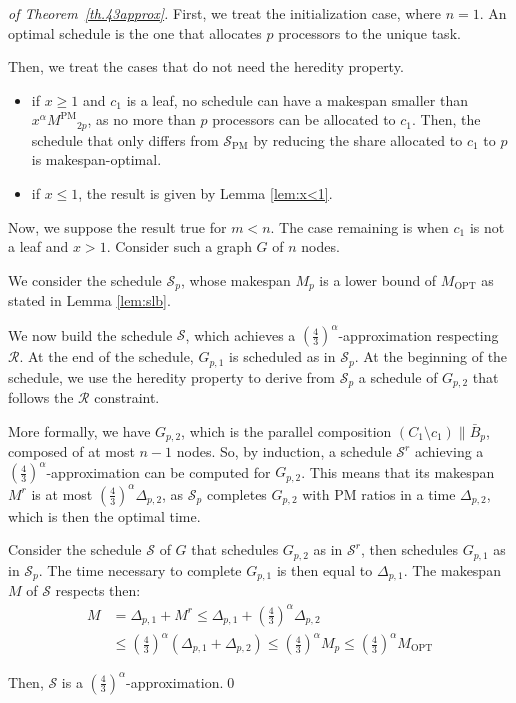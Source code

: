 \documentclass{llncs}
\newcommand{\para}[2]{#1 \mathop{\parallel} #2}
\newcommand{\s}{\mathcal S\xspace}
\newcommand{\spm}{\ensuremath{\mathcal{S}_{\mathrm{PM}}}\xspace}
\newcommand{\mpm}{\ensuremath{M^{\mathrm{PM}}}\xspace}
\newcommand{\mopt}{\ensuremath{{M}_{\mathrm{OPT}}}\xspace}
\newcommand{\R}{\ensuremath{\mathcal{R}}\xspace}
\newcommand{\frtrd}{\ensuremath{\left(\frac{4}{3}\right)^\alpha}}
\begin{document}
 
\begin{proof}[of Theorem~\ref{th.43approx}]
First, we treat the initialization case, where $n=1$. An optimal schedule is the one that allocates $p$ processors to the unique task.

Then, we treat the cases that do not need the heredity property.
\begin{itemize}
\item if $x\geq 1$ and $c_1$ is a leaf, no schedule can have a makespan smaller than $x^\alpha \mpm_{2p}$, as no more than $p$ processors can be allocated to $c_1$. Then, the schedule that only differs from \spm by reducing the share allocated to $c_1$ to $p$ is makespan-optimal.
\item if $x\leq 1$, the result is given by Lemma \ref{lem:x<1}. 
\end{itemize}

Now, we suppose the result true for $m<n$. The case remaining is when $c_1$ is not a leaf and $x>1$. Consider such a graph $G$ of $n$ nodes.





We consider the schedule $\s_p$, whose makespan $M_p$ is a lower bound of \mopt as stated in Lemma \ref{lem:slb}.  




We now build the schedule $\s$, which achieves a $\frtrd$-approximation respecting $\R$.
At the end of the schedule, $G_{p,1}$ is scheduled as in $\s_p$. At the beginning of the schedule, we use the heredity property to derive from $\s_p$ a schedule of $G_{p,2}$ that follows the \R constraint.


More formally, we have $G_{p,2}$, which is the parallel composition $\para{(C_1\setminus c_1)}{\bar B_p}$, composed of at most $n-1$ nodes. So, by induction, a schedule $\s^r$ achieving a \frtrd-approximation can be computed for $G_{p,2}$. This means that its makespan $M^r$ is at most $\frtrd \Delta_{p,2}$, as $\s_p$ completes $G_{p,2}$ with PM ratios in a time $\Delta_{p,2}$, which is then the optimal time.

Consider the schedule $\s$ of $G$ that schedules $G_{p,2}$ as in $\s^r$, then schedules $G_{p,1}$ as in $\s_p$. The time necessary to complete $G_{p,1}$ is then equal to $\Delta_{p,1}$.
The makespan $M$ of $\s$ respects then:
 \begin{align*}
 M &= \Delta_{p,1} + M^r \leq \Delta_{p,1} + \frtrd \Delta_{p,2} \\ 
 &\leq \frtrd \left(\Delta_{p,1} + \Delta_{p,2}\right)\leq \frtrd M_{p} \leq \frtrd \mopt
 \end{align*}
 
  Then, $\s$ is a $\frtrd$-approximation.\qed
\end{proof}
\end{document}
